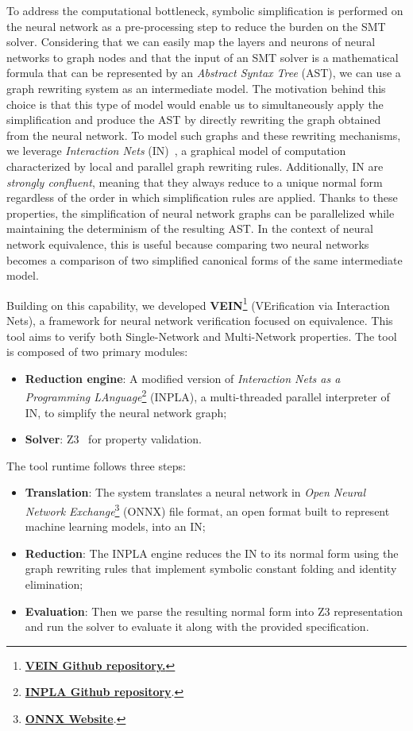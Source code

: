 To address the computational bottleneck, symbolic simplification is performed on the neural
network as a pre-processing step to reduce the burden on the SMT solver. Considering that we can
easily map the layers and neurons of neural networks to graph nodes and that the input of an SMT
solver is a mathematical formula that can be represented by an \textit{Abstract Syntax Tree} (AST), we can
use a graph rewriting system as an intermediate model. The motivation behind this choice is that
this type of model would enable us to simultaneously apply the simplification and produce the AST by
directly rewriting the graph obtained from the neural network.
To model such graphs and these rewriting mechanisms, we leverage \textit{Interaction Nets}
(IN)~\cite{lafont1990interactionnets}, a graphical model of computation characterized by local and
parallel graph rewriting rules. Additionally, IN are \textit{strongly confluent}, meaning that they
always reduce to a unique normal form regardless of the order in which simplification rules are
applied. Thanks to these properties, the simplification of neural network graphs can be parallelized
while maintaining the determinism of the resulting AST. In the context of neural network equivalence,
this is useful because comparing two neural networks becomes a comparison of two simplified
canonical forms of the same intermediate model.

Building on this capability, we developed
\textbf{VEIN}\footnote{\href{https://github.com/eric-marin/VEIN}{\textbf{VEIN Github repository.}}}
(VErification via Interaction Nets), a framework for neural network verification focused on
equivalence. This tool aims to verify both Single-Network and Multi-Network properties. The tool is
composed of two primary modules:
\begin{itemize}
	\item \textbf{Reduction engine}: A modified version of \textit{Interaction Nets as a Programming
		LAnguage}\footnote{\href{https://github.com/inpla/inpla}{\textbf{INPLA Github repository}}.}
		(INPLA), a multi-threaded parallel interpreter of IN, to simplify the neural
		network graph;
	\item \textbf{Solver}: Z3~\cite{demoura2008z3} for property validation.
\end{itemize}
The tool runtime follows three steps:
\begin{itemize}
	\item \textbf{Translation}: The system translates a neural network in \textit{Open Neural Network
		Exchange}\footnote{\href{https://onnx.ai/}{\textbf{ONNX Website}}.}
		(ONNX) file format, an open format built to represent machine learning models, into an IN;
	\item \textbf{Reduction}: The INPLA engine reduces the IN to its normal form using the graph
		rewriting rules that implement symbolic constant folding and identity elimination;
	\item \textbf{Evaluation}: Then we parse the resulting normal form into Z3 representation and run the
		solver to evaluate it along with the provided specification.
\end{itemize}

